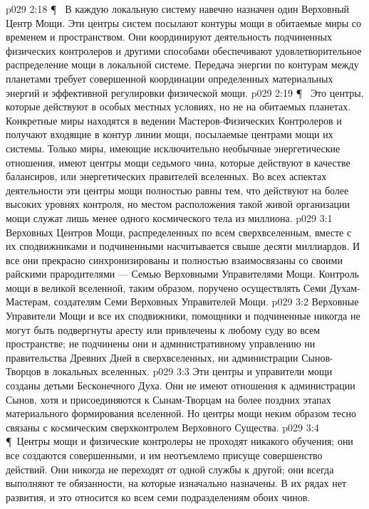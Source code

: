 \vs p029 2:18 \P\ \bibnobreakspace {} В каждую локальную систему навечно назначен один Верховный Центр Мощи. Эти центры систем посылают контуры мощи в обитаемые миры со временем и пространством. Они координируют деятельность подчиненных физических контролеров и другими способами обеспечивают удовлетворительное распределение мощи в локальной системе. Передача энергии по контурам между планетами требует совершенной координации определенных материальных энергий и эффективной регулировки физической мощи.
\vs p029 2:19 \P\ \bibnobreakspace {} Это центры, которые действуют в особых местных условиях, но не на обитаемых планетах. Конкретные миры находятся в ведении Мастеров\hyp{}Физических Контролеров и получают входящие в контур линии мощи, посылаемые центрами мощи их системы. Только миры, имеющие исключительно необычные энергетические отношения, имеют центры мощи седьмого чина, которые действуют в качестве балансиров, или энергетических правителей вселенных. Во всех аспектах деятельности эти центры мощи полностью равны тем, что действуют на более высоких уровнях контроля, но местом расположения такой живой организации мощи служат лишь менее одного космического тела из миллиона.
\vs p029 3:1 Верховных Центров Мощи, распределенных по всем сверхвселенным, вместе с их сподвижниками и подчиненными насчитывается свыше десяти миллиардов. И все они прекрасно синхронизированы и полностью взаимосвязаны со своими райскими прародителями --- Семью Верховными Управителями Мощи. Контроль мощи в великой вселенной, таким образом, поручено осуществлять Семи Духам\hyp{}Мастерам, создателям Семи Верховных Управителей Мощи.
\vs p029 3:2 Верховные Управители Мощи и все их сподвижники, помощники и подчиненные никогда не могут быть подвергнуты аресту или привлечены к любому суду во всем пространстве; не подчинены они и административному управлению ни правительства Древних Дней в сверхвселенных, ни администрации Сынов\hyp{}Творцов в локальных вселенных.
\vs p029 3:3 Эти центры и управители мощи созданы детьми Бесконечного Духа. Они не имеют отношения к администрации Сынов, хотя и присоединяются к Сынам\hyp{}Творцам на более поздних этапах материального формирования вселенной. Но центры мощи неким образом тесно связаны с космическим сверхконтролем Верховного Существа.
\vs p029 3:4 \P\ Центры мощи и физические контролеры не проходят никакого обучения; они все создаются совершенными, и им неотъемлемо присуще совершенство действий. Они никогда не переходят от одной службы к другой; они всегда выполняют те обязанности, на которые изначально назначены. В их рядах нет развития, и это относится ко всем семи подразделениям обоих чинов.
